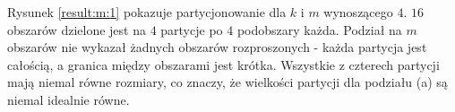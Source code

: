Rysunek \ref{result:m:1} pokazuje partycjonowanie dla $k$ i $m$ wynoszącego $4$.
$16$ obszarów dzielone jest na $4$ partycje po $4$ podobszary każda.
Podział na $m$ obszarów nie wykazał żadnych obszarów rozproszonych - każda partycja jest całością,
a granica między obszarami jest krótka.
Wszystkie z czterech partycji mają niemal równe rozmiary, co znaczy, że wielkości partycji dla podziału (a) są
niemal idealnie równe.
\begin{figure}[h]
\centering
\begin{subfigure}{.33\textwidth}
    \centering
    \caption[short]{}
\end{subfigure}%
\begin{subfigure}{.33\textwidth}
    \centering

\end{subfigure}
\end{figure}
